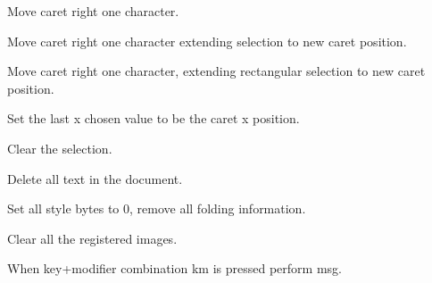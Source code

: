 Move caret right one character.


\label{wxstyledtextctrlcharrightextend}


Move caret right one character extending selection to new caret position.


\label{wxstyledtextctrlcharrightrectextend}


Move caret right one character, extending rectangular selection to new caret position.


\label{wxstyledtextctrlchoosecaretx}


Set the last x chosen value to be the caret x position.


\label{wxstyledtextctrlclear}


Clear the selection.


\label{wxstyledtextctrlclearall}


Delete all text in the document.


\label{wxstyledtextctrlcleardocumentstyle}


Set all style bytes to 0, remove all folding information.


\label{wxstyledtextctrlclearregisteredimages}


Clear all the registered images.


\label{wxstyledtextctrlcmdkeyassign}


When key+modifier combination km is pressed perform msg.


\label{wxstyledtextctrlcmdkeyclear}

